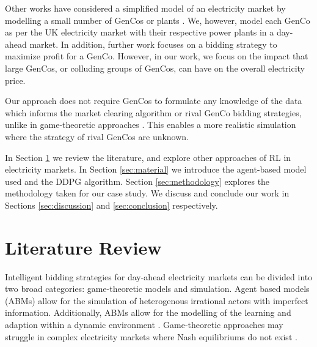 Other works have considered a simplified model of an electricity market by modelling a small number of GenCos or plants \cite{EsmaeiliAliabadi2017,Tellidou2007}. We, however, model each GenCo as per the UK electricity market with their respective power plants in a day-ahead market. In addition, further work focuses on a bidding strategy to maximize profit for a GenCo. However, in our work, we focus on the impact that large GenCos, or colluding groups of GenCos, can have on the overall electricity price.


Our approach does not require GenCos to formulate any knowledge of the data which informs the market clearing algorithm or rival GenCo bidding strategies, unlike in game-theoretic approaches \cite{Wang2011}. This enables a more realistic simulation where the strategy of rival GenCos are unknown.

In Section \ref{sec:lit-review} we review the literature, and explore other approaches of RL in electricity markets. In Section \ref{sec:material} we introduce the agent-based model used and the DDPG algorithm. Section \ref{sec:methodology} explores the methodology taken for our case study. We discuss and conclude our work in Sections \ref{sec:discussion} and \ref{sec:conclusion} respectively. 














\section{Literature Review}
\label{sec:lit-review}

Intelligent bidding strategies for day-ahead electricity markets can be divided into two broad categories: game-theoretic models and simulation. Agent based models (ABMs) allow for the simulation of heterogenous irrational actors with imperfect information. Additionally, ABMs allow for the modelling of the learning and adaption within a dynamic environment \cite{EsmaeiliAliabadi2017}. Game-theoretic approaches may struggle in complex electricity markets where Nash equilibriums do not exist \cite{Wang2011}.

